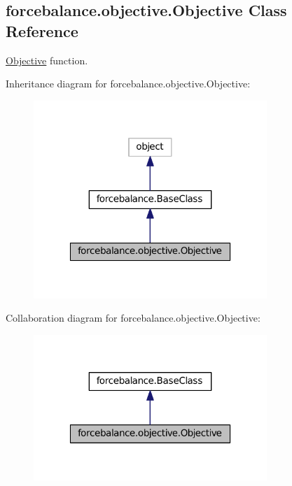 \hypertarget{classforcebalance_1_1objective_1_1Objective}{\subsection{forcebalance.\-objective.\-Objective Class Reference}
\label{classforcebalance_1_1objective_1_1Objective}
}


\hyperlink{classforcebalance_1_1objective_1_1Objective}{Objective} function.  




Inheritance diagram for forcebalance.\-objective.\-Objective\-:\nopagebreak
\begin{figure}[H]
\begin{center}
\leavevmode
\includegraphics[width=250pt]{classforcebalance_1_1objective_1_1Objective__inherit__graph}
\end{center}
\end{figure}


Collaboration diagram for forcebalance.\-objective.\-Objective\-:\nopagebreak
\begin{figure}[H]
\begin{center}
\leavevmode
\includegraphics[width=250pt]{classforcebalance_1_1objective_1_1Objective__coll__graph}
\end{center}
\end{figure}
